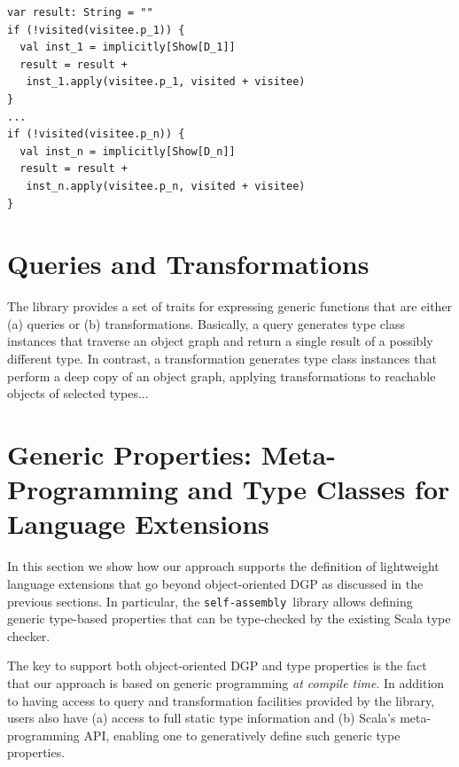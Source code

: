 \documentclass[preprint]{sigplanconf}
\newcommand{\selfassembly}{\texttt{self-assembly~}}
\begin{document}
\begin{lstlisting}
var result: String = ""
if (!visited(visitee.p_1)) {
  val inst_1 = implicitly[Show[D_1]]
  result = result +
   inst_1.apply(visitee.p_1, visited + visitee)
}
...
if (!visited(visitee.p_n)) {
  val inst_n = implicitly[Show[D_n]]
  result = result +
   inst_n.apply(visitee.p_n, visited + visitee)
}
\end{lstlisting}
\noindent


\section{Queries and Transformations}\label{sec:queries-transformations}

The library provides a set of traits for expressing generic functions that are
either (a) queries or (b) transformations. Basically, a query generates type
class instances that traverse an object graph and return a single result of a
possibly different type. In contrast, a transformation generates type class
instances that perform a deep copy of an object graph, applying
transformations to reachable objects of selected types...


\section{Generic Properties: Meta-Programming and Type Classes for Language Extensions}
\label{sec:language-extensions}

In this section we show how our approach supports the definition of
lightweight language extensions that go beyond object-oriented DGP as
discussed in the previous sections. In particular, the \selfassembly library
allows defining generic type-based properties that can be type-checked by the
existing Scala type checker.


The key to support both object-oriented DGP and type properties is the fact
that our approach is based on generic programming {\em at compile time}. In
addition to having access to query and transformation facilities provided by
the library, users also have (a) access to full static type information and
(b) Scala's meta-programming API, enabling one to generatively define such
generic type properties.
\end{document}
